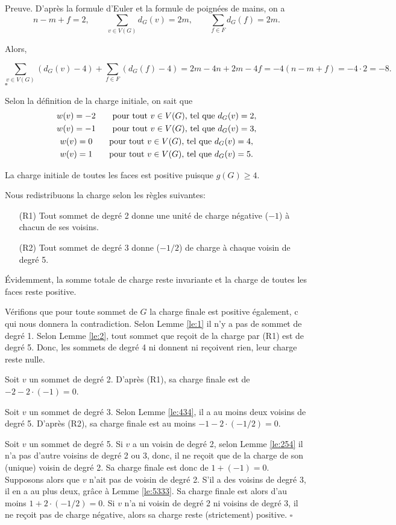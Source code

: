 \documentclass[10pt,a4paper]{article}
\newcommand{\ep}{{\hfill $\square$}}
\begin{document}
Preuve.
D'après la formule d'Euler et la formule de poignées de mains, on a
$$ 
n - m + f = 2, \qquad
\sum_{v\in V(G)} d_G(v) = 2m, \qquad
\sum_{f\in F} d_G(f) = 2m. 
$$

Alors,

$$ \sum_{v \in V(G)} (d_G(v) - 4) + \sum_{f\in F} (d_G(f) -4) = 2m -4n + 2m - 4f = -4(n - m + f) = -4\cdot 2 = -8.$$
\ep 

Selon la définition de la charge initiale, on sait que
$$ 
\gathered
w(v) = -2 \qquad \textrm{pour tout $v \in V(G)$, tel que } d_G(v) = 2, \\
w(v) = -1 \qquad \textrm{pour tout $v \in V(G)$, tel que } d_G(v) = 3, \\
w(v) =  0 \qquad \textrm{pour tout $v \in V(G)$, tel que } d_G(v) = 4, \\
w(v) =  1 \qquad \textrm{pour tout $v \in V(G)$, tel que } d_G(v) = 5.
\endgathered
$$

La charge initiale de toutes les faces est positive puisque $g(G)\ge 4$.

Nous redistribuons la charge selon les règles suivantes:
\begin{enumerate}
\item[(R1)] Tout sommet de degré 2 donne une unité de charge négative ($-1$) à chacun de ses voisins.
\item[(R2)] Tout sommet de degré 3 donne ($-1/2$) de charge à chaque voisin de degré 5.
\end{enumerate}

Évidemment, la somme totale de charge reste invariante et la charge de toutes les faces reste positive.

Vérifions que pour toute sommet de $G$ la charge finale est positive également, c qui nous donnera la contradiction.
Selon Lemme \ref{le:1} il n'y a pas de sommet de degré 1.
Selon Lemme \ref{le:2}, tout sommet que reçoit de la charge par (R1) est de degré 5. Donc, les sommets de degré 4 ni donnent ni reçoivent rien, leur charge reste nulle.

Soit $v$ un sommet de degré 2. D'après (R1), sa charge finale est de $-2 - 2\cdot (-1)=0$.

Soit $v$ un sommet de degré 3. Selon Lemme \ref{le:434}, il a au moins deux voisins de degré 5. D'après (R2), sa charge finale est au moins $-1 - 2\cdot (-1/2) = 0$.

Soit $v$ un sommet de degré 5. Si $v$ a un voisin de degré 2, selon Lemme \ref{le:254} il n'a pas d'autre voisins de degré 2 ou 3, donc, il ne reçoit que de la charge de son (unique) voisin de degré 2. Sa charge finale est donc de $1+(-1)=0$.
Supposons alors que $v$ n'ait pas de voisin de degré 2. S'il a des voisins de degré 3, il en a au plus deux, grâce à Lemme \ref{le:5333}. Sa charge finale est alors d'au moins $1+2\cdot(-1/2) = 0$. Si $v$ n'a ni voisin de degré 2 ni voisins de degré 3, il ne reçoit pas de charge négative, alors sa charge reste (strictement) positive.
\ep
\end{document}
